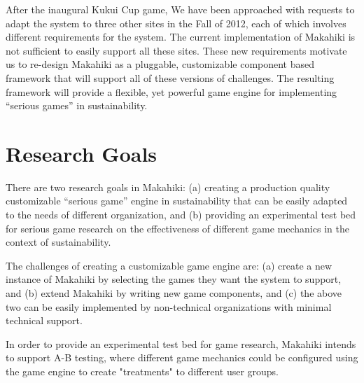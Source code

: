 \documentclass{acm_proc_article-sp}
\begin{document}
After the inaugural Kukui Cup game, We have been approached with requests to adapt the system to three other sites in the Fall of 2012, each of which involves different requirements for the system. The current implementation of Makahiki is not sufficient to easily support all these sites. These new requirements motivate us to re-design Makahiki as a pluggable, customizable component based framework that will support all of these versions of challenges.  The resulting framework will provide a flexible, yet powerful game engine for implementing ``serious games'' in sustainability.

\section{Research Goals}


There are two research goals in Makahiki: (a) creating a production quality customizable ``serious game'' engine in sustainability that can be easily adapted to the needs of different organization, and (b) providing an experimental test bed for serious game research on the effectiveness of different game mechanics in the context of sustainability.

The challenges of creating a customizable game engine are:  (a) create a new instance of Makahiki by selecting the games they want the system to support, and (b) extend Makahiki by writing new game components, and (c) the above two can be easily implemented by non-technical organizations with minimal technical support.

In order to provide an experimental test bed for game research, Makahiki intends to support A-B testing, where different game mechanics could be configured using the game engine to create "treatments" to different user groups. 
\end{document}
